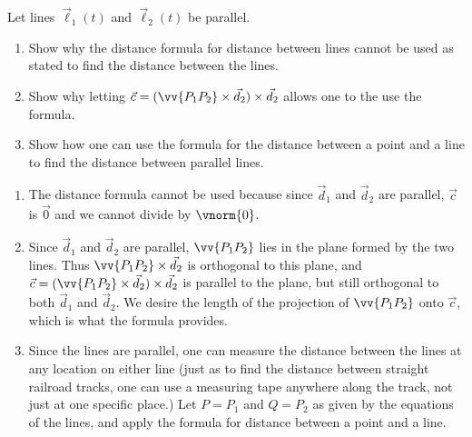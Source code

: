 {Let lines $\vec \ell_1(t)$ and $\vec \ell_2(t)$ be parallel. 
\begin{enumerate}
	\item Show why the distance formula for distance between lines cannot be used as stated to find the distance between the lines.
	\item	Show why letting $\vec c=(\vv{P_1P_2}\times\vec d_2)\times\vec d_2$ allows one to the use the formula.
	\item	Show how one can use the formula for the distance between a point and a line to find the distance between parallel lines.	
\end{enumerate}
}
{\begin{enumerate}
	\item The distance formula cannot be used because since $\vec d_1$ and $\vec d_2$ are parallel, $\vec c$ is $\vec 0$ and we cannot divide by $\vnorm{0}$.
	\item	Since $\vec d_1$ and $\vec d_2$ are parallel, $\vv{P_1P_2}$ lies in the plane formed by the two lines. Thus $\vv{P_1P_2}\times\vec d_2$ is orthogonal to this plane, and $\vec c=(\vv{P_1P_2}\times\vec d_2)\times \vec d_2$ is parallel to the plane, but still orthogonal to both $\vec d_1$ and $\vec d_2$. We desire the length of the projection of $\vv{P_1P_2}$ onto $\vec c$, which is what the formula provides.
	\item		Since the lines are parallel, one can measure the distance between the lines at any location on either line (just as to find the distance between straight railroad tracks, one can use a measuring tape anywhere along the track, not just at one specific place.) Let $P=P_1$ and $Q=P_2$ as given by the equations of the lines, and apply the formula for distance between a point and a line.
\end{enumerate}


}

